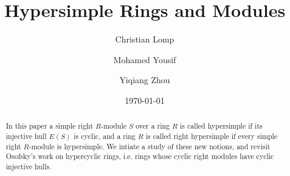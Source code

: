 \documentclass{amsart}
\theoremstyle{plain}
\numberwithin{equation}{section}
\begin{document}
\title{ {Hypersimple Rings and Modules}}
\author[Lomp]{Christian Lomp}
\address{CMUP, Departamento de Matemática, Faculdade de Ciências, Universidade do Porto, rua do Campo Alegre s/n, 4169-007 Porto, Portugal.}
\author[Yousif]{Mohamed Yousif}
\address{Department of Mathematics, The Ohio State University, Lima, Ohio 45804, USA.}
\author[Zhou]{Yiqiang Zhou}
\address{Department of Mathematics and Statistics, Memorial University of Newfoundland, St. John's, NL,
A1C 5S7, Canada.}
\date{
\today
}
\begin{abstract}In this paper a simple right $R$-module $S$ over a ring $R$ is called hypersimple if its injective hull $E (S)$ is cyclic, and a ring $R$ is called right hypersimple if every simple right $R$-module is hypersimple. We intiate a study of these new notions, and revisit Osofsky's work on hypercyclic rings, i.e. rings whose cyclic right modules have cyclic injective hulls. 
\end{abstract}
\maketitle
\end{document}
